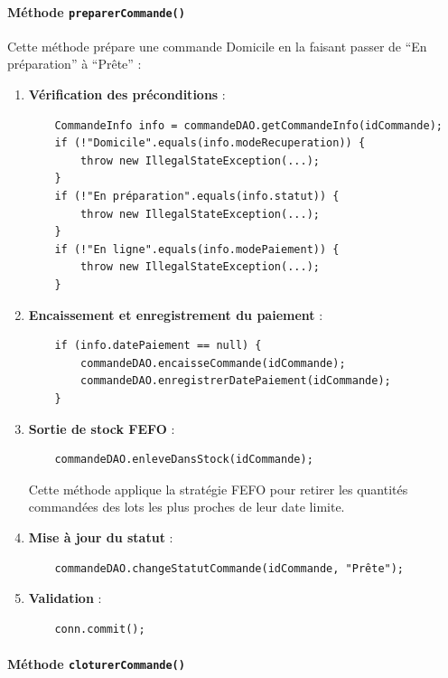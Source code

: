 \paragraph{Méthode \texttt{preparerCommande()}}

Cette méthode prépare une commande Domicile en la faisant passer de ``En préparation'' à ``Prête'' :

\begin{enumerate}
    \item \textbf{Vérification des préconditions} :
    \begin{verbatim}
    CommandeInfo info = commandeDAO.getCommandeInfo(idCommande);
    if (!"Domicile".equals(info.modeRecuperation)) {
        throw new IllegalStateException(...);
    }
    if (!"En préparation".equals(info.statut)) {
        throw new IllegalStateException(...);
    }
    if (!"En ligne".equals(info.modePaiement)) {
        throw new IllegalStateException(...);
    }
    \end{verbatim}
    
    \item \textbf{Encaissement et enregistrement du paiement} :
    \begin{verbatim}
    if (info.datePaiement == null) {
        commandeDAO.encaisseCommande(idCommande);
        commandeDAO.enregistrerDatePaiement(idCommande);
    }
    \end{verbatim}
    
    \item \textbf{Sortie de stock FEFO} :
    \begin{verbatim}
    commandeDAO.enleveDansStock(idCommande);
    \end{verbatim}
    Cette méthode applique la stratégie FEFO pour retirer les quantités commandées des lots les plus proches de leur date limite.
    
    \item \textbf{Mise à jour du statut} :
    \begin{verbatim}
    commandeDAO.changeStatutCommande(idCommande, "Prête");
    \end{verbatim}
    
    \item \textbf{Validation} :
    \begin{verbatim}
    conn.commit();
    \end{verbatim}
\end{enumerate}

\paragraph{Méthode \texttt{cloturerCommande()}}

